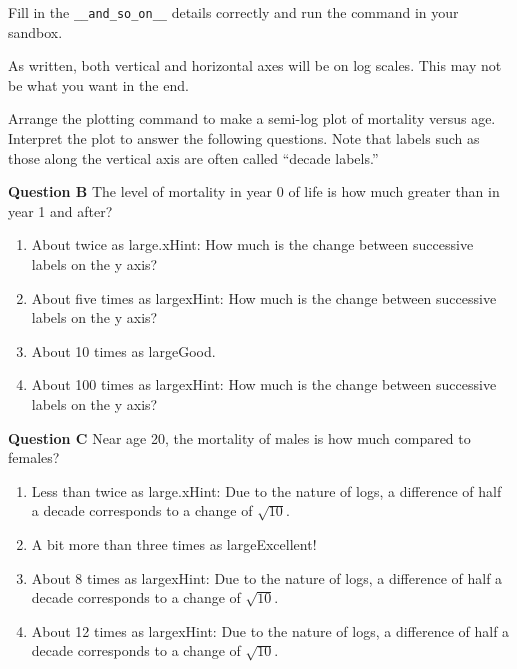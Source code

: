 \documentclass[
  letterpaper,
  DIV=11,
  numbers=noendperiod,
  oneside]{article}
\providecommand{\tightlist}{%
  \setlength{\itemsep}{0pt}\setlength{\parskip}{0pt}}\usepackage{longtable,booktabs,array}
\begin{document}
\begin{multicols}{2}
Fill in the \texttt{\_\_and\_so\_on\_\_} details correctly and run the
command in your sandbox.

As written, both vertical and horizontal axes will be on log scales.
This may not be what you want in the end.

Arrange the plotting command to make a semi-log plot of mortality versus
age. Interpret the plot to answer the following questions. Note that
labels such as those along the vertical axis are often called ``decade
labels.''

\textbf{Question B} The level of mortality in year 0 of life is how much
greater than in year 1 and after?

\begin{enumerate}
\def\labelenumi{\roman{enumi}.}
\tightlist
\item
  {About twice as large.{xHint: How much is the change between
  successive labels on the y axis?}}\\
\item
  {About five times as large{xHint: How much is the change between
  successive labels on the y axis?}}\\
\item
  {About 10 times as large{Good.~}}\\
\item
  {About 100 times as large{xHint: How much is the change between
  successive labels on the y axis?}}
\end{enumerate}

\textbf{Question C} Near age 20, the mortality of males is how much
compared to females?

\begin{enumerate}
\def\labelenumi{\roman{enumi}.}
\tightlist
\item
  {Less than twice as large.{xHint: Due to the nature of logs, a
  difference of half a decade corresponds to a change of
  \(\sqrt{10}\).}}\\
\item
  {A bit more than three times as large{Excellent!~}}\\
\item
  {About 8 times as large{xHint: Due to the nature of logs, a
  difference of half a decade corresponds to a change of
  \(\sqrt{10}\).}}\\
\item
  {About 12 times as large{xHint: Due to the nature of logs, a
  difference of half a decade corresponds to a change of
  \(\sqrt{10}\).}}
\end{enumerate}


\end{multicols}
\end{document}
